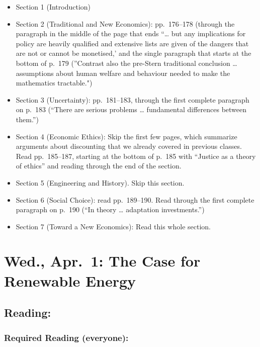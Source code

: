 \documentclass[
]{article}
\providecommand{\tightlist}{%
  \setlength{\itemsep}{0pt}\setlength{\parskip}{0pt}}
\begin{document}
\begin{itemize}
\tightlist
\item
  Section 1 (Introduction)
\item
  Section 2 (Traditional and New Economics): pp.~176--178 (through the
  paragraph in the middle of the page that ends ``\ldots{} but any
  implications for policy are heavily qualified and extensive lists are
  given of the dangers that are not or cannot be monetised,' and the
  single paragraph that starts at the bottom of p.~179 (''Contrast also
  the pre-Stern traditional conclusion \ldots{} assumptions about human
  welfare and behaviour needed to make the mathematics tractable.")
\item
  Section 3 (Uncertainty): pp.~181--183, through the first complete
  paragraph on p.~183 (``There are serious problems \ldots{} fundamental
  differences between them.'')
\item
  Section 4 (Economic Ethics): Skip the first few pages, which summarize
  arguments about discounting that we already covered in previous
  classes. Read pp.~185--187, starting at the bottom of p.~185 with
  ``Justice as a theory of ethics'' and reading through the end of the
  section.
\item
  Section 5 (Engineering and History). Skip this section.
\item
  Section 6 (Social Choice): read pp.~189--190. Read through the first
  complete paragraph on p.~190 (``In theory \ldots{} adaptation
  investments.'')
\item
  Section 7 (Toward a New Economics): Read this whole section.
\end{itemize}

\hypertarget{wed.-apr.-1-the-case-for-renewable-energy}{%
\section{Wed., Apr.~1: The Case for Renewable
Energy}\label{wed.-apr.-1-the-case-for-renewable-energy}}

\hypertarget{reading-33}{%
\subsection{Reading:}\label{reading-33}}

\hypertarget{required-reading-everyone-28}{%
\subsubsection{Required Reading
(everyone):}\label{required-reading-everyone-28}}
\end{document}
